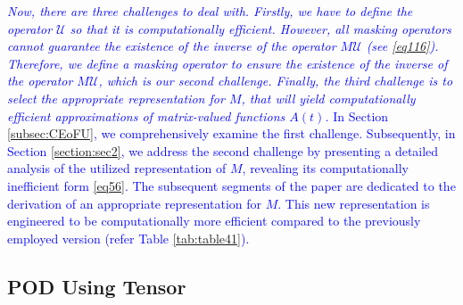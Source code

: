 \documentclass{article}
\begin{document}
\textcolor{blue}{\emph{Now, there are three challenges to deal with. Firstly, we have to define the operator $\mathcal{U}$ so that it is computationally efficient. However, all masking operators cannot guarantee the existence of the inverse of the operator $M\mathcal{U}$ (see \eqref{eq116}). Therefore, we define a masking operator to ensure the existence of the inverse of the operator $M\mathcal{U}$, which is our second challenge. Finally, the third challenge is to select the appropriate representation for $M$, that will yield computationally efficient approximations of matrix-valued functions $A(t)$.}
In Section \ref{subsec:CEoFU}, we comprehensively examine the first challenge. Subsequently, in Section \ref{section:sec2}, we address the second challenge by presenting a detailed analysis of the utilized representation of $M$, revealing its computationally inefficient form \eqref{eq56}. The subsequent segments of the paper are dedicated to the derivation of an appropriate representation for $M$. This new representation is engineered to be computationally more efficient compared to the previously employed version (refer Table \ref{tab:table41}).}

\subsection{POD Using Tensor}\label{Sec:POD}

\end{document}
